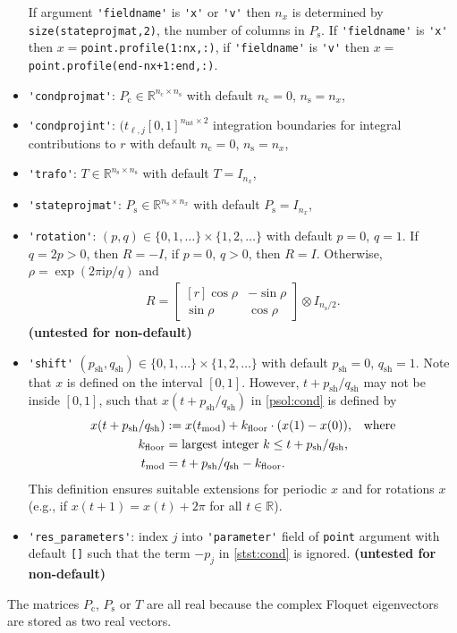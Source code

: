 \documentclass[11pt]{scrartcl}
\newcommand{\mt}[1]{\mathrm{#1}}
\renewcommand{\i}{\mt{i}}
\newcommand{\nc}{n_\mt{c}}
\newcommand{\ns}{n_\mt{s}}
\newcommand{\nint}{{n_\mt{int}}}
\newcommand{\Pc}{P_\mt{c}}
\newcommand{\Ps}{P_\mt{s}}
\newcommand{\psh}{p_\mt{sh}}
\newcommand{\qsh}{q_\mt{sh}}
\newcommand{\R}{\mathbb{R}}
\newcommand{\warn}[1]{\textbf{\color{red}(#1)}}
\newcommand{\blist}[1]{\mbox{\lstinline!#1!}}  \newlength{\tabw}
\begin{document}
\begin{itemize}
  If argument \blist{'fieldname'} is \blist{'x'} or \blist{'v'} then
  $n_x$ is determined by \blist{size(stateprojmat,2)}, the number of
  columns in $\Ps$. If \blist{'fieldname'} is \blist{'x'} then
  $x=$\blist{point.profile(1:nx,:)}, if \blist{'fieldname'} is
  \blist{'v'} then $x=$\blist{point.profile(end-nx+1:end,:)}.
\item \blist{'condprojmat'}: $\Pc\in\R^{\nc\times \ns}$ with default $\nc=0$, $\ns=n_x$,
\item \blist{'condprojint'}: $(t_{\ell,j}[0,1]^{\nint\times2}$ integration boundaries for integral contributions to $r$  with default $\nc=0$, $\ns=n_x$,
\item \blist{'trafo'}: $T\in\R^{\ns\times\ns}$ with default $T=I_{n_x}$,
\item \blist{'stateprojmat'}: $\Ps\in\R^{\ns\times n_x}$ with default $\Ps=I_{n_x}$,
\item \blist{'rotation'}: $(p,q)\in\{0,1,\ldots\}\times\{1,2,\ldots\}$
  with default $p=0$, $q=1$. If $q=2p>0$, then $R=-I$, if $p=0$,
  $q>0$, then $R=I$. Otherwise, $\rho=\exp(2\pi\i p/q)$ and
  \begin{align*}
    R=
    \begin{bmatrix*}[r]
      \cos\rho &-\sin\rho \\
      \sin\rho & \cos\rho 
    \end{bmatrix*}\otimes I_{\ns/2}.
  \end{align*} \warn{untested for non-default}
\item \blist{'shift'}
  $(\psh,\qsh)\in\{0,1,\ldots\}\times\{1,2,\ldots\}$ with default
  $\psh=0$, $\qsh=1$. Note that $x$ is defined on the interval
  $[0,1]$. However, $t+\psh/\qsh$ may not be inside $[0,1]$, such that
  $x(t+\psh/\qsh)$ in \eqref{psol:cond} is defined by
  \begin{align*}
    x(t+\psh/\qsh)&:=x(t_\mathrm{mod})+k_\mathrm{floor}\cdot(x(1)-x(0))\mbox{,\quad where}\\
    k_\mathrm{floor}&=\mbox{largest integer $k\leq t+\psh/\qsh$,}\\
    t_\mathrm{mod}&=t+\psh/\qsh-k_\mathrm{floor}.
  \end{align*}
  This definition ensures suitable extensions for periodic $x$ and for
  rotations $x$ (e.g., if $x(t+1)=x(t)+2\pi$ for all $t\in\R$).
\item \blist{'res_parameters'}: index $j$ into \blist{'parameter'}
  field of \blist{point} argument with default \blist{[]} such that
  the term $-p_j$ in \eqref{stst:cond} is ignored.  \warn{untested for
    non-default}
\end{itemize}
The matrices $\Pc$, $\Ps$ or $T$ are all real because the complex
Floquet eigenvectors are stored as two real vectors.
\end{document}
